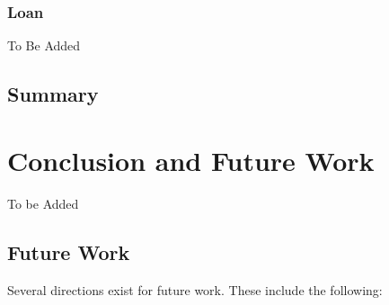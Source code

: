 \documentclass[12pt,english]{report}
\begin{document}
\subsection{Loan}

To Be Added

\section{Summary}


\chapter{Conclusion and Future Work}\label{chap:conclusion}

To be Added

\section{Future Work}

Several directions exist for future work. These include the following:

\newpage
{}



\end{document}
